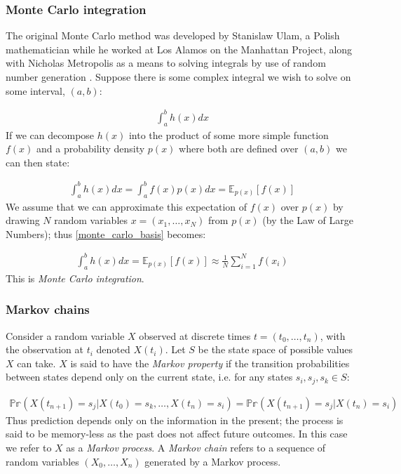 \documentclass[11pt]{article} %
\begin{document}
\subsubsection{Monte Carlo integration}
The original Monte Carlo method was developed by Stanislaw Ulam, a Polish mathematician while he worked at Los Alamos on the Manhattan Project, along with Nicholas Metropolis \cite{CooperCardinalsChaosReflection1989} as a means to solving integrals by use of random number generation \cite{MetropolisMonteCarloMethod1949}. Suppose there is some complex integral we wish to solve on some interval, $(a,b)$:

\begin{align}
\int_a^b h(x) dx
\end{align}
If we can decompose $h(x)$ into the product of some more simple function $f(x)$ and a probability density $p(x)$ where both are defined over $(a,b)$ we can then state:

\begin{align} \label{monte_carlo_basis}
\int_a^bh(x)dx = \int_a^bf(x)p(x)dx = \mathbb{E}_{p(x)}\left[f(x)\right]
\end{align}
We assume that we can approximate this expectation of $f(x)$ over $p(x)$ by drawing $N$ random variables $x = (x_1,\ldots,x_N)$ from $p(x)$ (by the Law of Large Numbers); thus \eqref{monte_carlo_basis} becomes:

\begin{align} \label{monte_carlo_integration}
\int_a^bh(x)dx = \mathbb{E}_{p(x)}\left[f(x)\right] \approx \frac{1}{N}\sum_{i=1}^Nf(x_i)
\end{align}
This is \emph{Monte Carlo integration}.

\subsubsection{Markov chains}
Consider a random variable $X$ observed at discrete times $t = (t_0,\ldots,t_n)$, with the observation at $t_i$ denoted $X(t_i)$. Let $S$ be the state space of possible values $X$ can take. $X$ is said to have the \emph{Markov property} if the transition probabilities between states depend only on the current state, i.e. for any states $s_i, s_j, s_k \in S$:

\begin{align}
\mathbb{Pr}(X(t_{n+1}) = s_j | X(t_0) = s_k, \ldots, X(t_n) = s_i) = \mathbb{Pr}(X(t_{n+1}) = s_j | X(t_n) = s_i) 
\end{align}
Thus prediction depends only on the information in the present; the process is said to be memory-less as the past does not affect future outcomes. In this case we refer to $X$ as a \emph{Markov process}. A \emph{Markov chain} refers to a sequence of random variables $(X_0,\ldots,X_n)$ generated by a Markov process.
\end{document}
